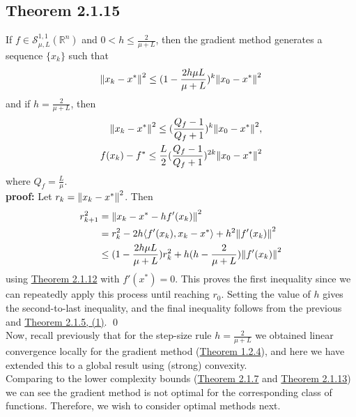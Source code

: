 \documentclass[12pt,a4paper]{article}
\begin{document}
	 \subsection*{Theorem 2.1.15}\label{thm2115}
	 If $f \in \mathcal{S}_{\mu, L}^{1,1}(\mathbb{R}^n)$ and $0 < h \leq \frac{2}{\mu + L}$, then the gradient method generates a sequence $\{x_k\}$ such that
	 \begin{align*}
	 	\norm{x_k - x^*}^2 \leq (1 - \frac{2h\mu L}{\mu + L})^k\norm{x_0 - x^*}^2
	 \end{align*}
	 and if $h = \frac{2}{\mu + L}$, then
	 \begin{align*}
	 	\norm{x_k - x^*}^2 \leq (\frac{Q_f - 1}{Q_f + 1})^k\norm{x_0 - x^*}^2, \\
	 	f(x_k) - f^* \leq \frac{L}{2}(\frac{Q_f - 1}{Q_f + 1})^{2k}\norm{x_0 - x^*}^2
	 \end{align*}
	 where $Q_f = \frac{L}{\mu}$.\\
	 \textbf{proof:} Let $r_k = \norm{x_k - x^*}^2$. Then
	 \begin{align*}
	 	r_{k+1}^2 &= \norm{x_k - x^* - hf'(x_k)}^2 \\
	 	&=r_k^2 - 2h\langle f'(x_k), x_k - x^* \rangle + h^2\norm{f'(x_k)}^2 \\
	 	&\leq (1 - \frac{2h\mu L}{\mu + L})r_k^2 + h(h - \frac{2}{\mu + L})\norm{f'(x_k)}^2
	 \end{align*}
	 using \hyperref[thm2112]{Theorem 2.1.12} with $f'(x^*) = 0$. This proves the first inequality since we can repeatedly apply this process until reaching $r_0$. Setting the value of $h$ gives the second-to-last inequality, and the final inequality follows from the previous and \hyperref[thm215]{Theorem 2.1.5, (1)}. \qed \\
	 Now, recall previously that for the step-size rule $h = \frac{2}{\mu + L}$ we obtained linear convergence locally for the gradient method (\hyperref[thm124]{Theorem 1.2.4}), and here we have extended this to a global result using (strong) convexity.\\
	 Comparing to the lower complexity bounds (\hyperref[thm217]{Theorem 2.1.7} and \hyperref[thm2113]{Theorem 2.1.13}) we can see the gradient method is not optimal for the corresponding class of functions. Therefore, we wish to consider optimal methods next.
\end{document}
